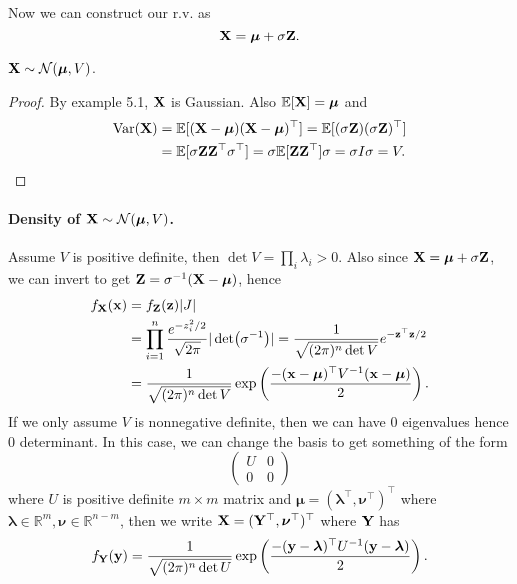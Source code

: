 Now we can construct our r.v. as 
\[
    {\bf X} = \boldsymbol{\mu}+ \sigma {\bf Z}.
\]
\begin{claim}
    $ {\bf X} \sim {\mathcal{N}}(\boldsymbol{\mu},V) $.
\end{claim}
\begin{proof}
    By example 5.1, ${\bf X}$ is Gaussian. Also $ {\mathbb{E}}[{\bf X}]=\boldsymbol{\mu} $ and
    \begin{align*}
        \operatorname{Var}({\bf X})&= {\mathbb{E}}[({\bf X}-\boldsymbol{\mu})({\bf X}-\boldsymbol{\mu})^\top]={\mathbb{E}}[(\sigma{\bf Z})(\sigma{\bf Z})^\top ]\\ 
        &= {\mathbb{E}}[\sigma{\bf Z} {\bf Z}^\top \sigma^\top ] = \sigma {\mathbb{E}}[{\bf Z} {\bf Z}^\top]\sigma = \sigma I \sigma = V.\qedhere
    \end{align*}
\end{proof}

\paragraph{Density of $ {\bf X} \sim {\mathcal{N}}(\boldsymbol{\mu},V) $.} Assume $V$ is positive definite, then $\det V=\prod_i\lambda_i>0$. Also since ${\bf X}=\boldsymbol{\mu}+\sigma {\bf Z}$, we can invert to get ${\bf Z}=\sigma^{-1}({\bf X}-\boldsymbol{\mu})$, hence
\begin{align*}
    f_{\bf X}({\bf x})&=f_{\bf Z}({\bf z})|J|\\
    &=\prod_{i=1}^n\frac{e^{-z_i^2/2}}{\sqrt{2\pi}}|\det(\sigma^{-1})|=\frac{1}{\sqrt{(2\pi)^n\det V}}e^{-{\bf z}^\top {\bf z}/2}\\
    &=\frac{1}{\sqrt{(2\pi)^n\det V}}\exp \left( \frac{-({\bf x}-\boldsymbol{\mu})^\top V^{-1}({\bf x}-\boldsymbol{\mu})}{2} \right).
\end{align*}
If we only assume $V$ is nonnegative definite, then we can have $0$ eigenvalues hence $0$ determinant.
In this case, we can change the basis to get something of the form
$$\begin{pmatrix}
    U&0\\
    0&0
\end{pmatrix}$$
where $U$ is positive definite $m\times m$ matrix and $\boldsymbol{\mu}=(\boldsymbol{\lambda}^\top,\boldsymbol{\nu}^\top)^\top$ where $\boldsymbol{\lambda}\in\mathbb R^m,\boldsymbol{\nu}\in\mathbb R^{n-m}$, then we write ${\bf X}=({\bf Y}^\top,\boldsymbol{\nu}^\top)^\top$ where ${\bf Y}$ has
$$f_{\bf Y}({\bf y})=\frac{1}{\sqrt{(2\pi)^n\det U}}\exp \left( \frac{-({\bf y}-\boldsymbol{\lambda})^\top U^{-1}({\bf y}-\boldsymbol{\lambda})}{2} \right).$$

